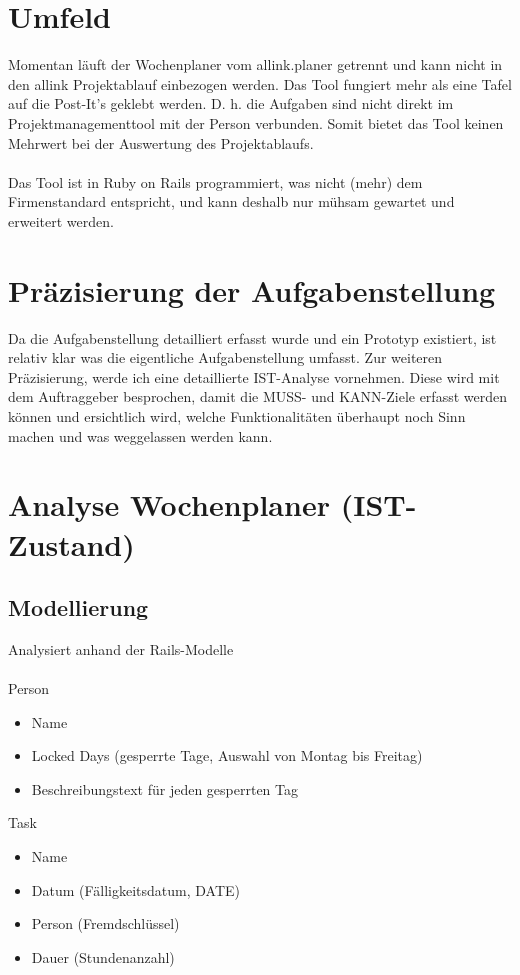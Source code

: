 \section{Umfeld}
Momentan läuft der Wochenplaner vom allink.planer getrennt und kann nicht in den allink Projektablauf einbezogen werden.
Das Tool fungiert mehr als eine Tafel auf die Post-It's geklebt werden. D. h. die Aufgaben sind nicht direkt im Projektmanagementtool mit der Person verbunden.
Somit bietet das Tool keinen Mehrwert bei der Auswertung des Projektablaufs.\\
\\
Das Tool ist in Ruby on Rails programmiert, was nicht (mehr) dem Firmenstandard entspricht, und kann deshalb nur mühsam gewartet und erweitert werden.

\section{Präzisierung der Aufgabenstellung}
Da die Aufgabenstellung detailliert erfasst wurde und ein Prototyp existiert, ist relativ klar was die eigentliche Aufgabenstellung umfasst.
Zur weiteren Präzisierung, werde ich eine detaillierte IST-Analyse vornehmen. Diese wird mit dem Auftraggeber besprochen, 
damit die MUSS- und KANN-Ziele erfasst werden können und ersichtlich wird, welche Funktionalitäten überhaupt noch Sinn machen und was weggelassen werden kann.

\section{Analyse Wochenplaner (IST-Zustand)}

\subsection{Modellierung}
    Analysiert anhand der Rails-Modelle\\
    \\
    Person
    \begin{itemize}
        \item Name
        \item Locked Days (gesperrte Tage, Auswahl von Montag bis Freitag)
        \item Beschreibungstext für jeden gesperrten Tag
    \end{itemize}
    Task
    \begin{itemize}
        \item Name
        \item Datum (Fälligkeitsdatum, DATE)
        \item Person (Fremdschlüssel)
        \item Dauer (Stundenanzahl)
    \end{itemize}

